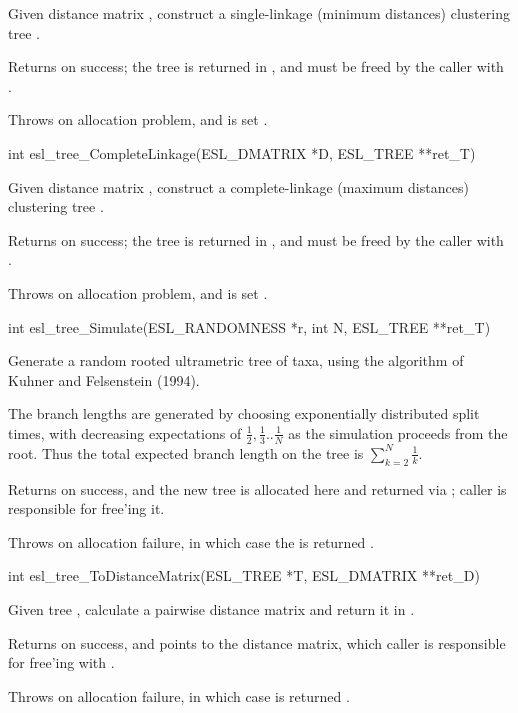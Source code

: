 \begin{sreapi}
Given distance matrix , construct a single-linkage
(minimum distances) clustering tree .

Returns  on success; the tree is returned in ,
and must be freed by the caller with .

Throws  on allocation problem, and  is set .


\hypertarget{func:esl_tree_CompleteLinkage()}
{\item[int esl\_tree\_CompleteLinkage(ESL\_DMATRIX *D, ESL\_TREE **ret\_T)]}

Given distance matrix , construct a complete-linkage
(maximum distances) clustering tree .

Returns  on success; the tree is returned in ,
and must be freed by the caller with .

Throws  on allocation problem, and  is set .


\hypertarget{func:esl_tree_Simulate()}
{\item[int esl\_tree\_Simulate(ESL\_RANDOMNESS *r, int N, ESL\_TREE **ret\_T)]}

Generate a random rooted ultrametric tree of  taxa,
using the algorithm of Kuhner and Felsenstein (1994).

The branch lengths are generated by choosing 
exponentially distributed split times, with decreasing
expectations of $\frac{1}{2},\frac{1}{3}..\frac{1}{N}$
as the simulation proceeds from the root. Thus the
total expected branch length on the tree is
$\sum_{k=2}^{N} \frac{1}{k}$.

Returns  on success, and the new tree is allocated
here and returned via ; caller is 
responsible for free'ing it.

Throws  on allocation failure, in which case
the  is returned .



\hypertarget{func:esl_tree_ToDistanceMatrix()}
{\item[int esl\_tree\_ToDistanceMatrix(ESL\_TREE *T, ESL\_DMATRIX **ret\_D)]}

Given tree , calculate a pairwise distance matrix
and return it in .

Returns  on success, and  points to the distance 
matrix, which caller is responsible for free'ing with
.

Throws  on allocation failure, in which case
 is returned .



\end{sreapi}


